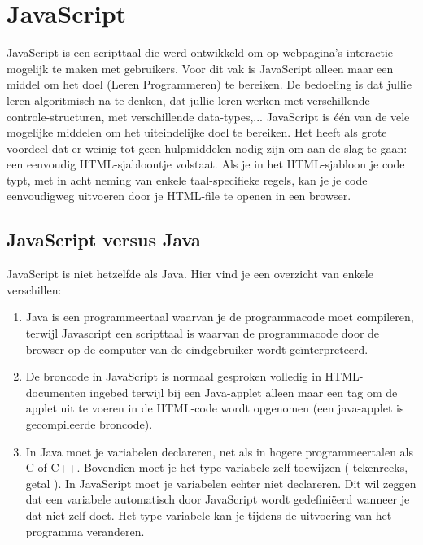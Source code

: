 \chapter{JavaScript}

JavaScript is een scripttaal die werd ontwikkeld om op webpagina's interactie mogelijk te maken met gebruikers.
Voor dit vak is JavaScript alleen maar een middel om het doel (Leren Programmeren) te bereiken.
De bedoeling is dat jullie leren algoritmisch na te denken, dat jullie leren werken met verschillende
controle-structuren, met verschillende data-types,... JavaScript is \'e\'en van de vele mogelijke middelen
om het uiteindelijke doel te bereiken. Het heeft als grote voordeel dat er weinig tot geen hulpmiddelen nodig
zijn om aan de slag te gaan: een eenvoudig HTML-sjabloontje volstaat. Als je in het HTML-sjabloon je code typt,
met in acht neming van enkele taal-specifieke regels, kan je je code eenvoudigweg uitvoeren door je HTML-file
te openen in een browser.


\section{JavaScript versus Java}

JavaScript is niet hetzelfde als Java. Hier vind je een overzicht van enkele verschillen:

\begin{enumerate}
\item Java is een programmeertaal waarvan je de programmacode moet compileren, terwijl Javascript een scripttaal is waarvan de programmacode door de browser op de computer van de eindgebruiker wordt ge\"interpreteerd.
\item De broncode in JavaScript is normaal gesproken volledig in HTML-documenten ingebed terwijl bij een Java-applet alleen maar een tag om de applet uit te voeren in de HTML-code wordt opgenomen (een java-applet is gecompileerde broncode).
\item In Java moet je variabelen declareren, net als in hogere programmeertalen als C of C++. Bovendien moet je het type variabele zelf toewijzen ( tekenreeks, getal ). In JavaScript moet je variabelen echter niet declareren. Dit wil zeggen dat een variabele automatisch door JavaScript wordt gedefini\"eerd wanneer je dat niet zelf doet. Het type variabele kan je tijdens de uitvoering van het programma veranderen.
\end{enumerate}

